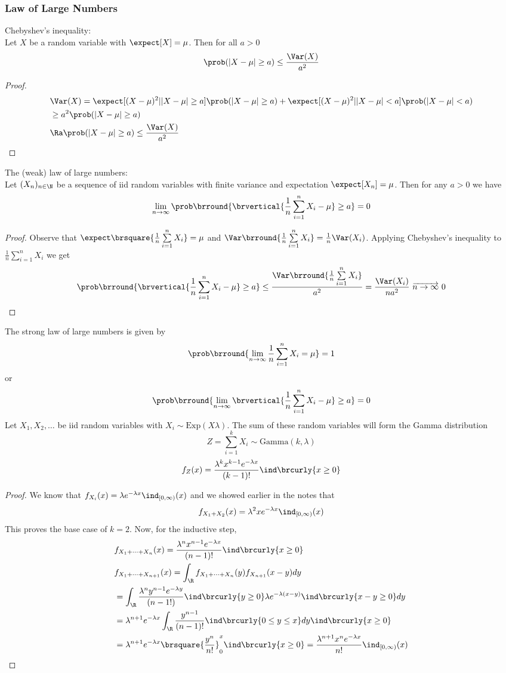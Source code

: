 \subsubsection{Law of Large Numbers}
Chebyshev's inequality:\\
Let $X$ be a random variable with $\expect[X]=\mu$. Then for all $a>0$
\[\prob(|X-\mu|\geq a)\leq\frac{\Var(X)}{a^2}\]
\begin{proof}
\begin{align*}
    &\Var(X)=\expect[(X-\mu)^2||X-\mu|\geq a]\prob(|X-\mu|\geq a) + \expect[(X-\mu)^2||X-\mu|<a]\prob(|X-\mu|<a)\\
    &\geq a^2\prob(|X-\mu|\geq a)\\
    &\Ra \prob(|X-\mu|\geq a)\leq\frac{\Var(X)}{a^2}
\end{align*}
\end{proof}
The (weak) law of large numbers:\\
Let $(X_n)_{n\in\N}$ be a sequence of iid random variables with finite variance and expectation $\expect[X_n]=\mu$. Then for any $a>0$ we have
\[\lim_{n\to\infty}\prob\brround{\brvertical{\frac{1}{n}\sum_{i=1}^n X_i-\mu}\geq a}=0\]
\begin{proof}
Observe that $\expect\brsquare{\frac{1}{n}\sum\limits_{i=1}^nX_i}=\mu$ and $\Var\brround{\frac{1}{n}\sum\limits_{i=1}^n X_i}=\frac{1}{n}\Var(X_i)$. Applying Chebyshev's inequality to $\frac{1}{n}\sum\limits_{i=1}^n X_i$ we get
\[\prob\brround{\brvertical{\frac{1}{n}\sum_{i=1}^n X_i-\mu}\geq a}\leq\frac{\Var\brround{\frac{1}{n}\sum\limits_{i=1}^n X_i}}{a^2}=\frac{\Var(X_i)}{na^2}\ \overrightarrow{n\to\infty}\ 0\]
\end{proof}
The strong law of large numbers is given by
\[\prob\brround{\lim_{n\to\infty}\frac{1}{n}\sum_{i=1}^n X_i=\mu}=1\]
or
\[\prob\brround{\lim_{n\to\infty}\brvertical{\frac{1}{n}\sum_{i=1}^n X_i-\mu}\geq a}=0\]
Let $X_1,X_2,\ldots$ be iid random variables with $X_i\sim\mathrm{Exp}(X\lambda)$. The sum of these random variables will form the Gamma distribution
\[Z=\sum_{i=1}^k X_i\sim\mathrm{Gamma}(k,\lambda)\]
\[f_Z(x)=\frac{\lambda^kx^{k-1}e^{-\lambda x}}{(k-1)!}\ind\brcurly{x\geq0}\]
\begin{proof}
We know that $f_{X_i}(x)=\lambda e^{-\lambda x}\ind_{[0,\infty)}(x)$ and we showed earlier in the notes that
\[f_{X_1+X_2}(x)=\lambda^2xe^{-\lambda x}\ind_{[0,\infty)}(x)\]
This proves the base case of $k=2$. Now, for the inductive step,
\begin{align*}
    &f_{X_1+\cdots+X_n}(x)=\frac{\lambda^nx^{n-1}e^{-\lambda x}}{(n-1)!}\ind\brcurly{x\geq0}\\
    &f_{X_1+\cdots+X_{n+1}}(x)=\int_\R f_{X_1+\cdots+X_n}(y)f_{X_{n+1}}(x-y)dy\\
    &=\int_\R\frac{\lambda^ny^{n-1}e^{-\lambda y}}{(n-1!)}\ind\brcurly{y\geq0}\lambda e^{-\lambda(x-y)}\ind\brcurly{x-y\geq 0}dy\\
    &=\lambda^{n+1}e^{-\lambda x}\int_\R\frac{y^{n-1}}{(n-1)!}\ind\brcurly{0\leq y\leq x}dy\ind\brcurly{x\geq 0}\\
    &=\lambda^{n+1}e^{-\lambda x}\brsquare{\frac{y^n}{n!}}_0^x\ind\brcurly{x\geq0}=\frac{\lambda^{n+1}x^ne^{-\lambda x}}{n!}\ind_{[0,\infty)}(x)
\end{align*}
\end{proof}
